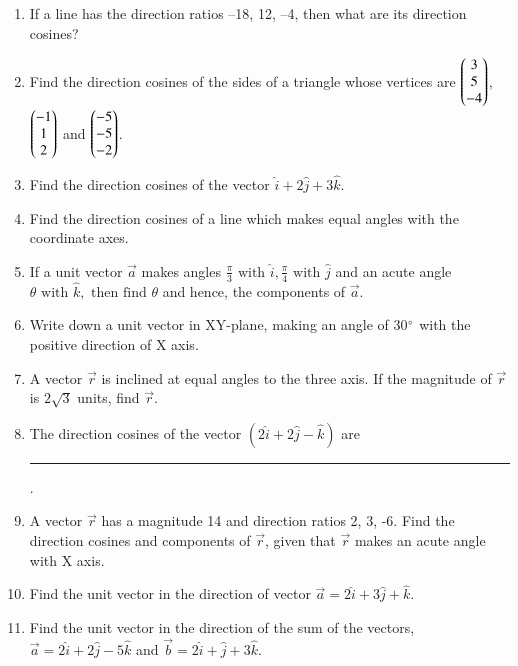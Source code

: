 \begin{enumerate}[label=\thesubsection.\arabic*, ref=\thesubsection.\theenumi]
	\\
\solution
		
\item If a line has the direction ratios –18,  12,  –4,  then what are its direction cosines?
		\\
		\solution
		
	\item Find the direction cosines of the sides of a triangle whose vertices are $\begin{pmatrix}3\\ 5\\-4 \end{pmatrix}$,  $\begin{pmatrix} -1\\1 \\2 \end{pmatrix}$ and $\begin{pmatrix}-5 \\-5 \\-2 \end{pmatrix}$.
		\\
		\solution
		
\item Find the direction cosines of the vector $\hat{i}+2\hat{j}+3\hat{k}$.
	\\
    \solution 
		
    \item Find the direction cosines of a line which makes equal angles with the coordinate
    axes.
		\\
		\solution
		
\item If a unit vector $\overrightarrow{a}$ makes angles $\frac{\pi}{3}\text{ with }\hat{i},  \frac{\pi}{4}\text{ with }\hat{j}$ and an acute angle $\theta \text{ with }\hat{k}, \text{ then find } \theta$ and hence,  the components of $\overrightarrow{a}$.
	\\
		\solution
		
\item Write down a unit vector in XY-plane,  making an angle of 30$\degree$ with the positive direction of X axis.\\
\item A vector $\vec{r}$ is inclined at equal angles to the three axis. If the magnitude of $\vec{r}$ is $2\sqrt{3}$ units,  find $\vec{r}$.
\item The direction cosines of the vector $(2\hat{i}+2\hat{j}-\hat{k})$ are \noindent\rule{2cm}{0.4pt}.
\item A vector $\vec{r}$ has a magnitude 14 and direction ratios 2,  3,  -6. Find the direction cosines and components of $\vec{r}$,  given that $\vec{r}$ makes an acute angle with X axis.
\item Find the unit vector in the direction of vector $\overrightarrow{a} = 2\hat{i} +3\hat{j} +\hat{k}$.
\item Find the unit vector in the direction of the sum of the vectors, $\overrightarrow{a} = 2\hat{i} +2\hat{j} -5\hat{k}$ and $\overrightarrow{b} = 2\hat{i} +\hat{j} +3\hat{k}$.

\end{enumerate}

